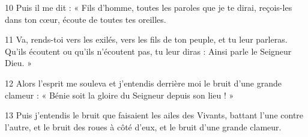 
10 Puis il me dit : « Fils d’homme, toutes les paroles que je te dirai, reçois-les dans ton cœur, écoute de toutes tes oreilles.

11 Va, rends-toi vers les exilés, vers les fils de ton peuple, et tu leur parleras. Qu’ils écoutent ou qu’ils n’écoutent pas, tu leur diras : Ainsi parle le Seigneur Dieu. »

12 Alors l’esprit me souleva et j’entendis derrière moi le bruit d’une grande clameur : « Bénie soit la gloire du Seigneur depuis son lieu ! »

13 Puis j’entendis le bruit que faisaient les ailes des Vivants, battant l’une contre l’autre, et le bruit des roues à côté d’eux, et le bruit d’une grande clameur.